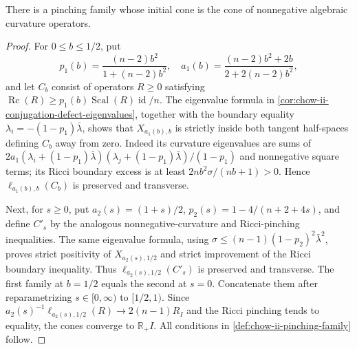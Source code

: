 \begin{theorem}
  \label{thm:chow-ii-pinching-family-nonnegative-curvature}
  There is a pinching family whose initial cone is the cone of nonnegative
  algebraic curvature operators.
\end{theorem}
\begin{proof}
  For \(0\le b\le1/2\), put
  \[
  p_1(b)=\frac{(n-2)b^2}{1+(n-2)b^2},\quad
  a_1(b)=\frac{(n-2)b^2+2b}{2+2(n-2)b^2},
  \]
  and let \(C_b\) consist of operators \(R\ge0\) satisfying
  \(\operatorname{Rc}(R)\ge p_1(b)\operatorname{Scal}(R)\operatorname{id}/n\).
  The eigenvalue formula in
  \ref{cor:chow-ii-conjugation-defect-eigenvalues}, together with the boundary
  equality \(\lambda_i=-(1-p_1)\bar\lambda\), shows that
  \(X_{a_1(b),b}\) is strictly inside both tangent half-spaces defining
  \(C_b\) away from zero.  Indeed its curvature eigenvalues are sums of
  \(2a_1(\lambda_i+(1-p_1)\bar\lambda)
  (\lambda_j+(1-p_1)\bar\lambda)/(1-p_1)\) and nonnegative square terms;
  its Ricci boundary excess is at least
  \(2nb^2\sigma/(nb+1)>0\).  Hence
  \(\ell_{a_1(b),b}(C_b)\) is preserved and transverse.

  Next, for \(s\ge0\), put
  \(a_2(s)=(1+s)/2\), \(p_2(s)=1-4/(n+2+4s)\), and define \(C'_s\) by the
  analogous nonnegative-curvature and Ricci-pinching inequalities.  The same
  eigenvalue formula, using
  \(\sigma\le(n-1)(1-p_2)^2\bar\lambda^2\), proves strict positivity of
  \(X_{a_2(s),1/2}\) and strict improvement of the Ricci boundary inequality.
  Thus \(\ell_{a_2(s),1/2}(C'_s)\) is preserved and transverse.  The first
  family at \(b=1/2\) equals the second at \(s=0\).  Concatenate them after
  reparametrizing \(s\in[0,\infty)\) to \([1/2,1)\).  Since
  \(a_2(s)^{-1}\ell_{a_2(s),1/2}(R)\to2(n-1)R_I\) and the Ricci pinching tends
  to equality, the cones converge to \(\mathbb R_+I\).  All conditions in
  \ref{def:chow-ii-pinching-family} follow.
\end{proof}

